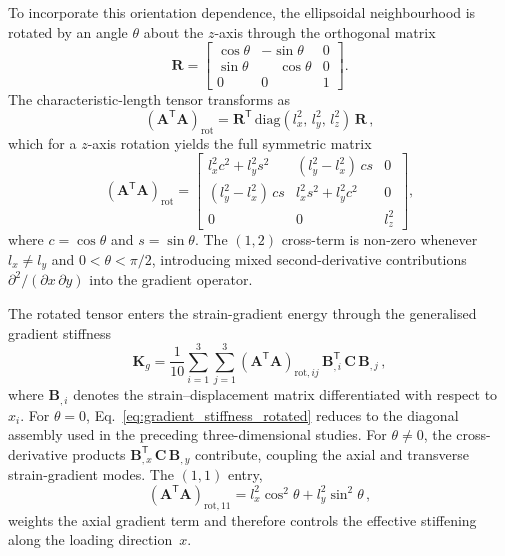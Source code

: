 \documentclass[final,3p,times,fleqn]{elsarticle}
\begin{document}
To incorporate this orientation dependence, the ellipsoidal
neighbourhood is rotated by an angle $\theta$ about the $z$-axis through
the orthogonal matrix
%
\begin{equation}
\mathbf{R} =
\begin{bmatrix}
\cos\theta & -\sin\theta & 0 \\
\sin\theta & \phantom{-}\cos\theta & 0 \\
0     & 0           & 1
\end{bmatrix}.
\label{eq:rotation_matrix}
\end{equation}
%
The characteristic-length tensor transforms as
%
\begin{equation}
(\mathbf{A}^{\mathsf{T}}\mathbf{A})_{\mathrm{rot}}
= \mathbf{R}^{\mathsf{T}}\,
\mathrm{diag}(l_{x}^{2},\, l_{y}^{2},\, l_{z}^{2})\,
\mathbf{R}\,,
\label{eq:AAT_rot}
\end{equation}
%
which for a $z$-axis rotation yields the full symmetric matrix
%
\begin{equation}
(\mathbf{A}^{\mathsf{T}}\mathbf{A})_{\mathrm{rot}}
= \begin{bmatrix}
l_{x}^{2}c^{2} + l_{y}^{2}s^{2}
 & (l_{y}^{2}-l_{x}^{2})\,cs & 0 \\[4pt]
(l_{y}^{2}-l_{x}^{2})\,cs
 & l_{x}^{2}s^{2} + l_{y}^{2}c^{2} & 0 \\[4pt]
0 & 0 & l_{z}^{2}
\end{bmatrix},
\label{eq:AAT_rot_explicit}
\end{equation}
%
where $c = \cos\theta$ and $s = \sin\theta$.
The $(1,2)$ cross-term is non-zero whenever $l_{x}\neq l_{y}$ and
$0 < \theta < \pi/2$, introducing mixed second-derivative contributions
$\partial^{2}/(\partial x\,\partial y)$ into the gradient operator.

The rotated tensor enters the strain-gradient energy through the
generalised gradient stiffness
%
\begin{equation}
\mathbf{K}_{g}
= \frac{1}{10}\sum_{i=1}^{3}\sum_{j=1}^{3}
(\mathbf{A}^{\mathsf{T}}\mathbf{A})_{\mathrm{rot},ij}\,
\mathbf{B}_{,i}^{\mathsf{T}}\,\mathbf{C}\,\mathbf{B}_{,j}\,,
\label{eq:gradient_stiffness_rotated}
\end{equation}
%
where $\mathbf{B}_{,i}$ denotes the strain--displacement matrix
differentiated with respect to $x_{i}$.
For $\theta = 0$, Eq.~\eqref{eq:gradient_stiffness_rotated} reduces to
the diagonal assembly used in the preceding three-dimensional studies.
For $\theta\neq 0$, the cross-derivative products
$\mathbf{B}_{,x}^{\mathsf{T}}\,\mathbf{C}\,\mathbf{B}_{,y}$ contribute,
coupling the axial and transverse strain-gradient modes.
The $(1,1)$ entry,
%
\begin{equation}
(\mathbf{A}^{\mathsf{T}}\mathbf{A})_{\mathrm{rot},11}
= l_{x}^{2}\cos^{2}\theta + l_{y}^{2}\sin^{2}\theta\,,
\label{eq:AAT_rot_11}
\end{equation}
%
weights the axial gradient term and therefore controls the effective
stiffening along the loading direction~$x$.
\end{document}

